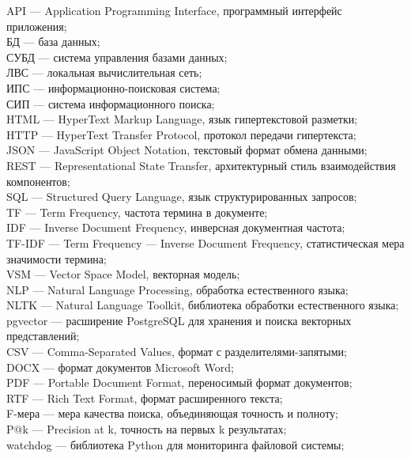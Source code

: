 \label{sec:reduction}
\begin{flushleft}
	\setlength{\parindent}{1.25cm}
		\indent
	\indent API --- Application Programming Interface, программный интерфейс приложения;\\
	\indent БД --- база данных;\\
	\indent СУБД --- система управления базами данных;\\
	\indent ЛВС --- локальная вычислительная сеть;\\
	\indent ИПС --- информационно-поисковая система;\\
	\indent СИП --- система информационного поиска;\\
	\indent HTML --- HyperText Markup Language, язык гипертекстовой разметки;\\
	\indent HTTP --- HyperText Transfer Protocol, протокол передачи гипертекста;\\
	\indent JSON --- JavaScript Object Notation, текстовый формат обмена данными;\\
	\indent REST --- Representational State Transfer, архитектурный стиль взаимодействия компонентов;\\
	\indent SQL --- Structured Query Language, язык структурированных запросов;\\
	\indent TF --- Term Frequency, частота термина в документе;\\
	\indent IDF --- Inverse Document Frequency, инверсная документная частота;\\
	\indent TF-IDF --- Term Frequency --- Inverse Document Frequency, статистическая мера значимости термина;\\
	\indent VSM --- Vector Space Model, векторная модель;\\
	\indent NLP --- Natural Language Processing, обработка естественного языка;\\
	\indent NLTK --- Natural Language Toolkit, библиотека обработки естественного языка;\\
	\indent pgvector --- расширение PostgreSQL для хранения и поиска векторных представлений;\\
	\indent CSV --- Comma-Separated Values, формат с разделителями-запятыми;\\
	\indent DOCX --- формат документов Microsoft Word;\\
	\indent PDF --- Portable Document Format, переносимый формат документов;\\
	\indent RTF --- Rich Text Format, формат расширенного текста;\\
	\indent F-мера --- мера качества поиска, объединяющая точность и полноту;\\
	\indent P@k --- Precision at k, точность на первых k результатах;\\
	\indent watchdog --- библиотека Python для мониторинга файловой системы;\\
\end{flushleft}
